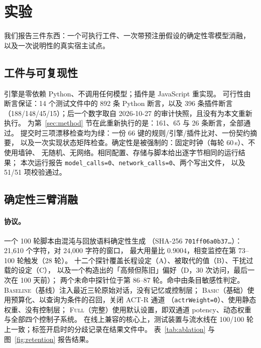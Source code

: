 \section{实验}

我们报告三件东西：一个可执行工件、一次带预注册假设的确定性零模型消融，
以及一次说明性的真实宿主试点。

\subsection{工件与可复现性}

引擎是零依赖 Python、不调用任何模型；插件是 JavaScript 重实现。
可行性由断言保证：14 个测试文件中的 892 条 Python 断言，以及 396 条插件断言
（188/148/45/15）；后一个数字取自 2026-10-27 的审计快照，且没有为本文重新执行。
为第~\ref{sec:method} 节在此重新执行的是：161、65 与 26 条断言，全部通过。
提交时三项漂移检查均为绿：一份 66 键的规则/引擎/插件比对、一份契约摘要，
以及一次实现状态矩阵检查。确定性是被强制的：固定时钟（每轮 60\,s）、不使用墙钟、
无随机、无网络。相同配置、存储与脚本给出逐字节相同的运行结果；
本次运行报告 \texttt{model\_calls=0}、\texttt{network\_calls=0}、两个写出文件，
以及 51/51 项校验通过。

\subsection{确定性三臂消融}

\paragraph{协议。} 一个 100 轮脚本由混沌与回放语料确定性生成
（SHA-256 \texttt{701ff06a0b37\ldots}）：21,610 个字符，对 24,000 字符的窗口，
最大用量比 $0.9004$，相变监控在第 73--100 轮触发（28 轮）。
十二个探针覆盖长程设定（A）、被取代的值（B）、干扰过载的设定（C），
以及一个构造出的「高频但陈旧」偏好（D，30 次访问，最后一次在 100 天前）；
两个未命中探针位于第 86--87 轮。命中由条目敏感性判定。
\textsc{Baseline}（基线）注入最近三轮原始对话，没有记忆或控制层；
\textsc{Basic}（基础）使用预算化、以查询为条件的召回，关闭 ACT-R 通道
（\texttt{actrWeight=0}）、使用静态权重、没有控制层；
\textsc{Full}（完整）使用默认设置，即双通道 potency、动态权重与全部四个控制子系统。
在线上兼容的核心上，测试装置与流水线在 100/100 轮上一致；标签开启时的分歧记录在结果文件中。
表~\ref{tab:ablation} 与图~\ref{fig:retention} 报告结果。

